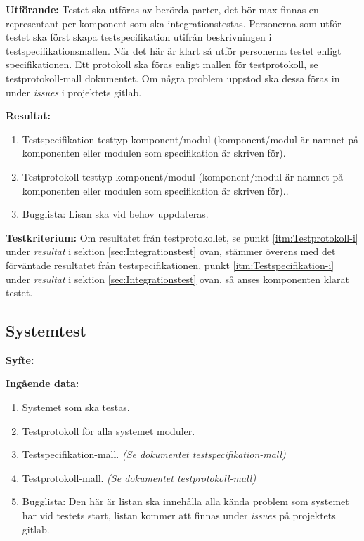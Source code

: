 \documentclass[a4paper,10pt]{article}
\begin{document}
\textbf{Utförande:} Testet ska utföras av berörda parter, det bör max finnas en representant per komponent som ska integrationstestas. Personerna som utför testet ska först skapa testspecifikation utifrån beskrivningen i testspecifikationsmallen. När det här är klart så utför personerna testet enligt specifikationen. Ett protokoll ska föras enligt mallen för testprotokoll, se testprotokoll-mall dokumentet. Om några problem uppstod ska dessa föras in under \emph{issues} i projektets gitlab.

\textbf{Resultat:}
    \begin{enumerate}
        \item \label{itm:Testspecifikation-i} Testspecifikation-testtyp-komponent/modul (komponent/modul är namnet på komponenten eller modulen som specifikation är skriven för).
        \item \label{itm:Testprotokoll-i} Testprotokoll-testtyp-komponent/modul (komponent/modul är namnet på komponenten eller modulen som specifikation är skriven för)..
        \item Bugglista: Lisan ska vid behov uppdateras.
    \end{enumerate}

\textbf{Testkriterium:} Om resultatet från testprotokollet, se punkt \ref{itm:Testprotokoll-i} under \emph{resultat} i sektion \ref{sec:Integrationstest} ovan, stämmer överens med det förväntade resultatet från testspecifikationen, punkt \ref{itm:Testspecifikation-i} under \emph{resultat} i sektion \ref{sec:Integrationstest} ovan, så anses komponenten klarat testet.

\subsection{Systemtest}
\label{sec:Systemtest}
\textbf{Syfte:}

\textbf{Ingående data:}
   \begin{enumerate}
       \item Systemet som ska testas.
       \item Testprotokoll för alla systemet moduler.
       \item Testspecifikation-mall. \emph{(Se dokumentet testspecifikation-mall)}
       \item Testprotokoll-mall. \emph{(Se dokumentet testprotokoll-mall)}
       \item Bugglista: Den här är listan ska innehålla alla kända problem som systemet har vid testets start, listan kommer att finnas under \emph{issues} på projektets gitlab.
   \end{enumerate}
\end{document}
